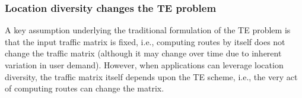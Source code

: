 \subsubsection{Location diversity changes the TE problem}


A key assumption underlying the traditional formulation of the TE problem is that the input traffic matrix is fixed, i.e., computing routes by itself does not  change the traffic matrix (although it may change over time due to inherent variation in user demand). However, when applications can leverage location diversity, the traffic matrix itself depends upon the TE scheme, i.e., the very act of computing routes can change the matrix. 


%	
%
%	

